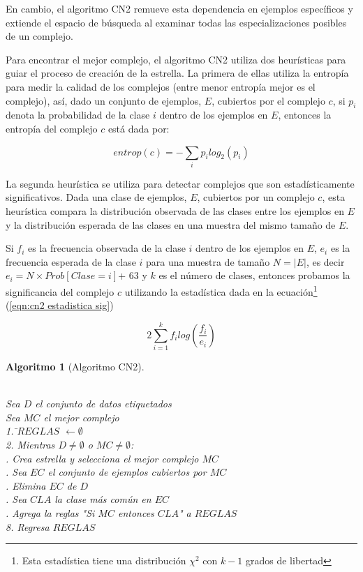 \documentclass[12pt]{scrbook}
\theoremstyle{break}
\theoremstyle{break}
\newtheorem{algoritmo}{Algoritmo}[chapter]
\begin{document}
En cambio, el algoritmo CN2 remueve esta dependencia en ejemplos específicos y extiende el espacio de búsqueda al examinar todas las especializaciones posibles de un complejo.

Para encontrar el mejor complejo, el algoritmo CN2 utiliza dos heurísticas para guiar el proceso de creación de la estrella. La primera de ellas utiliza la entropía para medir la calidad de los complejos (entre menor entropía mejor es el complejo), así, dado un conjunto de ejemplos, $E$, cubiertos por el complejo $c$, si $p_i$ denota la probabilidad de la clase $i$ dentro de los ejemplos en $E$, entonces la entropía del complejo $c$ está dada por:

\begin{equation} \label{eqn:entropia complejo}
entrop(c) = - \sum_{i} p_i log_{2}(p_{i})
\end{equation}

La segunda heurística se utiliza para detectar complejos que son estadísticamente significativos. Dada una clase de ejemplos, $E$, cubiertos por un complejo $c$, esta heurística compara la distribución observada de las clases entre los ejemplos en $E$ y la distribución esperada de las clases en una muestra del mismo tamaño de $E$.

Si $f_i$ es la frecuencia observada de la clase $i$ dentro de los ejemplos en $E$, $e_{i}$ es la frecuencia esperada de la clase $i$ para una muestra de tamaño $N=\vert E \vert$, es decir $e_i = N \times Prob\left[ Clase = i \right]$+
63 y $k$ es el número de clases, entonces probamos la significancia del complejo $c$ utilizando la estadística dada en la ecuación\footnote{Esta estadística tiene una distribución $\chi^2$ con $k-1$ grados de libertad } (\ref{eqn:cn2 estadistica sig})

\begin{equation} \label{eqn:cn2 estadistica sig}
2 \sum_{i=1}^{k} f_{i} log\left(\frac{f_{i}} {e_{i}} \right)
\end{equation}

\begin{algoritmo}[Algoritmo CN2]
\begin{tabbing}
\\Sea $D$ el conjunto de datos etiquetados
\\Sea $MC$ el mejor complejo\\
1. \=$REGLAS$ $\leftarrow \emptyset $ \\
2. Mientras $D \neq \emptyset$ o $MC \neq \emptyset$:\\
 . Crea estrella y selecciona el mejor complejo $MC$\\
 . Sea $EC$ el conjunto de ejemplos cubiertos por $MC$ \\
 . Elimina $EC$ de $D$\\
 . Sea $CLA$ la clase más común en $EC$\\
 . Agrega la reglas "Si $MC$ entonces $CLA$" a $REGLAS$\\
8. Regresa $REGLAS$
\end{tabbing}
\label{algo:CN2}
\end{algoritmo}
\end{document}

